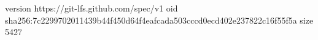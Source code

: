 version https://git-lfs.github.com/spec/v1
oid sha256:7c2299702011439b44f450d64f4eafcada503cccd0ecd402e237822c16f55f5a
size 5427
